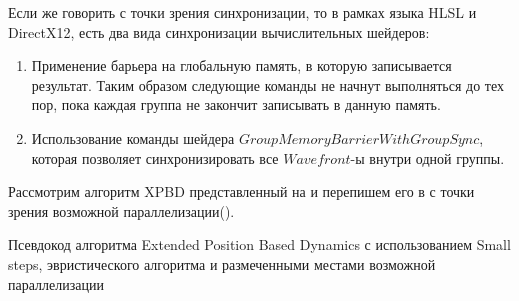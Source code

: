 	Если же говорить с точки зрения синхронизации, то в рамках языка HLSL и DirectX12, есть два вида синхронизации вычислительных шейдеров:
	\begin{enumerate}[1.]
		\item Применение барьера на глобальную память, в которую записывается результат. Таким образом следующие команды не начнут выполняться до тех пор, пока каждая группа не закончит записывать в данную память.
		\item Использование команды шейдера $GroupMemoryBarrierWithGroupSync$, которая позволяет синхронизировать все $Wavefront$-ы внутри одной группы.
	\end{enumerate}
	
	Рассмотрим алгоритм XPBD представленный на  и перепишем его в с точки зрения возможной параллелизации().

\begin{algorithm} [h]
	\nonl{}
	\caption{Псевдокод алгоритма Extended Position Based Dynamics с использованием Small steps, эвристического алгоритма и размеченными местами возможной параллелизации}\label{alg:HeuristicParallelXPBD}
\end{algorithm}

